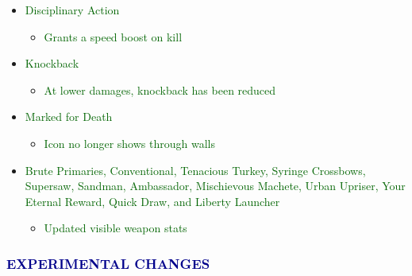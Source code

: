 \documentclass{article}
\begin{document}
\begin{itemize}
\begin{itemize}
    \end{itemize}
    \item \textcolor{darkgreen}{Disciplinary Action}
    \begin{itemize}
        \item \textcolor{darkgreen}{Grants a speed boost on kill}
    \end{itemize}
    \item \textcolor{darkgreen}{Knockback}
    \begin{itemize}
        \item \textcolor{darkgreen}{At lower damages, knockback has been reduced}
    \end{itemize}
    \item \textcolor{darkgreen}{Marked for Death}
    \begin{itemize}
        \item \textcolor{darkgreen}{Icon no longer shows through walls}
    \end{itemize}
    \item \textcolor{darkgreen}{Brute Primaries, Conventional, Tenacious Turkey, Syringe Crossbows, Supersaw, Sandman, Ambassador, Mischievous Machete, Urban Upriser, Your Eternal Reward, Quick Draw, and Liberty Launcher}
    \begin{itemize}
        \item \textcolor{darkgreen}{Updated visible weapon stats}
    \end{itemize}
\end{itemize}




\subsubsection*{\textcolor{darkblue}{EXPERIMENTAL CHANGES}}
\end{document}
